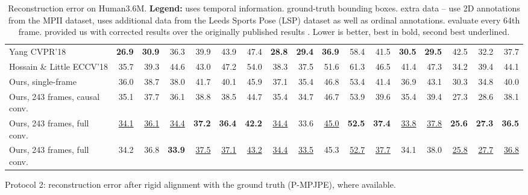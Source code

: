\documentclass[10pt,twocolumn,letterpaper]{article}
\begin{document}
\begin{table*}[t]
\begin{subtable}{\linewidth}
{\begin{tabular}{@{}l|rrrrrrrrrrrrrrr|r@{}}
    		Yang \etal \cite{yang:3d:2018} CVPR'18  & \textbf{26.9} & \textbf{30.9} & 36.3 & 39.9 & 43.9 & 47.4 & \textbf{28.8} & \textbf{29.4} & \textbf{36.9} & 58.4 & 41.5 & \textbf{30.5} & \textbf{29.5} & 42.5 & 32.2 & 37.7 \\
            Hossain \& Little \cite{hossain:exploiting:2018} ECCV'18  & 35.7 & 39.3 & 44.6 & 43.0 & 47.2 & 54.0 & 38.3 & 37.5 & 51.6 & 61.3 & 46.5 & 41.4 & 47.3 & 34.2 & 39.4 & 44.1 \\
    		\midrule
    		Ours, single-frame & 36.0 & 38.7 & 38.0 & 41.7 & 40.1 & 45.9 & 37.1 & 35.4 & 46.8 & 53.4 & 41.4 & 36.9 & 43.1 & 30.3 & 34.8 & 40.0 \\
    		Ours, 243 frames, causal conv.  & 35.1 & 37.7 & 36.1 & 38.8 & 38.5 & 44.7 & 35.4 & 34.7 & 46.7 & 53.9 & 39.6 & 35.4 & 39.4 & 27.3 & 28.6 & 38.1 \\
    		Ours, 243 frames, full conv.  & \underline{34.1} & \underline{36.1} & \underline{34.4} & \textbf{37.2} & \textbf{36.4} & \textbf{42.2} & \underline{34.4} & 33.6 & \underline{45.0} & \textbf{52.5} & \textbf{37.4} & \underline{33.8} & \underline{37.8} & \textbf{25.6} & \textbf{27.3} & \textbf{36.5} \\
    		Ours, 243 frames, full conv.  & 34.2 & 36.8 & \textbf{33.9} & \underline{37.5} & \underline{37.1} & \underline{43.2} & \underline{34.4} & \underline{33.5} & 45.3 & \underline{52.7} & \underline{37.7} & 34.1 & 38.0 & \underline{25.8} & \underline{27.7} & \underline{36.8}  \\
    		\bottomrule
    		\end{tabular}
    	}
    	\caption{Protocol 2: reconstruction error after rigid alignment with the ground truth (P-MPJPE), where available.}
    	\label{tbl:pose_results_best_p2}
	\end{subtable}
	\caption{Reconstruction error on Human3.6M. \textbf{Legend:}  uses temporal information.  ground-truth bounding boxes.  extra data -- \cite{sun:compositional:2017, pavlakos:ordinal:2018, yang:3d:2018, luvizon:2d:2018} use 2D annotations from the MPII dataset, \cite{pavlakos:ordinal:2018} uses additional data from the Leeds Sports Pose (LSP) dataset as well as ordinal annotations. \cite{sun:compositional:2017, luvizon:2d:2018} evaluate every 64th frame. \cite{hossain:exploiting:2018} provided us with corrected results over the originally published results \protect\footnotemark. Lower is better, best in bold, second best underlined.}
    \label{tbl:pose_results_best}
\end{table*}
\end{document}
